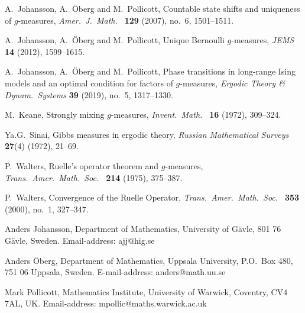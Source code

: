 \documentclass[11pt, a4paper]{amsart}
\theoremstyle{definition}
\theoremstyle{remark}
\begin{document}
\begin{thebibliography}{999}
 A.\ Johansson, A.\ \"Oberg and M.\ Pollicott,
  Countable state shifts and uniqueness of $g$-measures, {\em Amer.\
    J.\ Math.\ } {\bf 129} (2007), no.\ 6, 1501--1511.

 A.\ Johansson, A.\ \"Oberg and M.\ Pollicott, 
Unique Bernoulli $g$-measures, {\em JEMS} {\bf 14} (2012), 1599--1615.

 A.\ Johansson, A.\ \"Oberg and M.\ Pollicott, 
Phase transitions in long-range Ising models and an optimal 
condition for factors of $g$-measures, {\em Ergodic Theory \& Dynam.\ Systems}
{\bf 39} (2019), no.\ 5, 1317--1330.

  
 M.\ Keane, Strongly mixing $g$-measures, {\em Invent.\
    Math.\ } {\bf 16} (1972), 309--324.

Ya.G.\ Sinai, Gibbs measures in ergodic theory, {\em Russian Mathematical Surveys} {\bf 27}(4) (1972), 21--69. 

\bibitem{walters1}
P.\ Walters, Ruelle's operator theorem and $g$-measures, {\em Trans.\ Amer.\ Math.\ Soc.\ } {\bf 214} (1975), 375--387.

\bibitem{walters3}
P.\ Walters, Convergence of the Ruelle Operator, {\em Trans.\ Amer.\ Math.\ Soc.\ } {\bf 353} (2000), 
no.\ 1, 327--347.
\end{thebibliography}


\noindent
Anders Johansson, Department of Mathematics, University of G\"avle,
801 76 G\"avle, Sweden. Email-address: ajj@hig.se\newline

\noindent
Anders \"Oberg, Department of Mathematics, Uppsala University, P.O.\
Box 480, 751 06 Uppsala, Sweden. E-mail-address:
anders@math.uu.se\newline

\noindent
Mark Pollicott, Mathematics Institute, University of Warwick,
Coventry, CV4 7AL, UK. Email-address: mpollic@maths.warwick.ac.uk\newline
\end{document}
